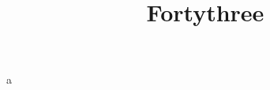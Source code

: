 \documentclass[11pt,a4paper,twocolumn]{article}
\title{Fortythree}
\begin{document}
a
\end{document}
